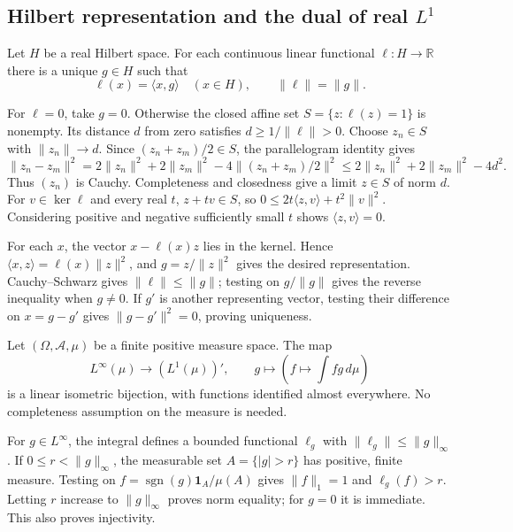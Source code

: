 \subsection{Hilbert representation and the dual of real \texorpdfstring{$L^1$}{L1}}
\begin{theorem}
\label{thm:real_Hilbert_representation}
Let $H$ be a real Hilbert space. For each continuous linear functional
$\ell:H\to\mathbb R$ there is a unique $g\in H$ such that
\[
\ell(x)=\langle x,g\rangle\quad(x\in H),\qquad \|\ell\|=\|g\|.
\]
\end{theorem}
\Proof
For $\ell=0$, take $g=0$. Otherwise the closed affine set
$S=\{z:\ell(z)=1\}$ is nonempty. Its distance $d$ from zero satisfies
$d\geq1/\|\ell\|>0$. Choose $z_n\in S$ with $\|z_n\|\to d$.
Since $(z_n+z_m)/2\in S$, the parallelogram identity gives
\[
\|z_n-z_m\|^2
=2\|z_n\|^2+2\|z_m\|^2-4\|(z_n+z_m)/2\|^2
\leq2\|z_n\|^2+2\|z_m\|^2-4d^2.
\]
Thus $(z_n)$ is Cauchy. Completeness and closedness give a limit
$z\in S$ of norm $d$. For $v\in\ker\ell$ and every real $t$,
$z+tv\in S$, so
$0\leq2t\langle z,v\rangle+t^2\|v\|^2$.
Considering positive and negative sufficiently small $t$ shows
$\langle z,v\rangle=0$.

For each $x$, the vector $x-\ell(x)z$ lies in the kernel. Hence
$\langle x,z\rangle=\ell(x)\|z\|^2$, and $g=z/\|z\|^2$ gives
the desired representation. Cauchy--Schwarz gives $\|\ell\|\leq\|g\|$;
testing on $g/\|g\|$ gives the reverse inequality when $g\ne0$.
If $g'$ is another representing vector, testing their difference on
$x=g-g'$ gives $\|g-g'\|^2=0$, proving uniqueness.
\Done

\begin{theorem}
\label{thm:L1_dual_finite}
Let $(\Omega,\mathcal A,\mu)$ be a finite positive measure space.
The map
\[
L^\infty(\mu)\longrightarrow (L^1(\mu))',\qquad
 g\longmapsto\left(f\longmapsto\int fg\,d\mu\right)
\]
is a linear isometric bijection, with functions identified almost everywhere.
No completeness assumption on the measure is needed.
\end{theorem}
\Proof
For $g\in L^\infty$, the integral defines a bounded functional
$\ell_g$ with $\|\ell_g\|\leq\|g\|_\infty$.
If $0\leq r<\|g\|_\infty$, the measurable set $A=\{|g|>r\}$ has
positive, finite measure. Testing on
$f=\operatorname{sgn}(g)\mathbf1_A/\mu(A)$ gives $\|f\|_1=1$ and
$\ell_g(f)>r$. Letting $r$ increase to $\|g\|_\infty$ proves norm
equality; for $g=0$ it is immediate. This also proves injectivity.


